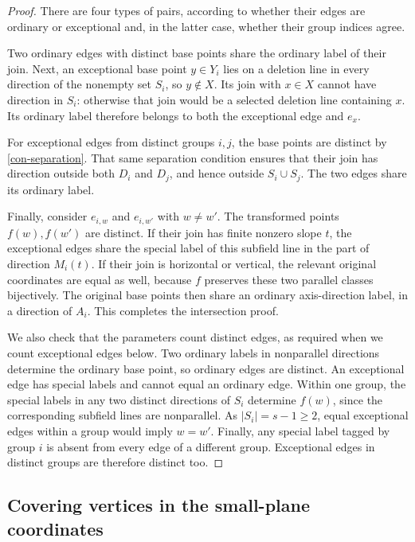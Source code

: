 \begin{proof}
There are four types of pairs, according to whether their edges are
ordinary or exceptional and, in the latter case, whether their group
indices agree.

Two ordinary edges with distinct base points share the ordinary
label of their join.  Next, an exceptional base point \(y\in Y_i\)
lies on a deletion line in every direction of the nonempty set
\(S_i\), so \(y\notin X\).  Its join with \(x\in X\) cannot
have direction in \(S_i\): otherwise that join would be a selected
deletion line containing \(x\).  Its ordinary label therefore
belongs to both the exceptional edge and \(e_x\).

For exceptional edges from distinct groups \(i,j\), the base
points are distinct by \eqref{con-separation}.  That same separation
condition ensures that their join has direction outside both
\(D_i\) and \(D_j\), and hence outside \(S_i\cup S_j\).
The two edges share its ordinary label.

Finally, consider \(e_{i,w}\) and \(e_{i,w'}\) with \(w\ne w'\).
The transformed points \(f(w),f(w')\) are distinct.  If their
join has finite nonzero slope \(t\), the exceptional edges share
the special label of this subfield line in the part of direction
\(M_i(t)\).  If their join is horizontal or vertical, the relevant
original coordinates are equal as well, because \(f\) preserves
these two parallel classes bijectively.  The original base points
then share an ordinary axis-direction label, in a direction of
\(A_i\).  This completes the intersection proof.

We also check that the parameters count distinct edges, as required
when we count exceptional edges below.  Two ordinary labels in
nonparallel directions determine the ordinary base point, so ordinary
edges are distinct.
An exceptional edge has special labels and cannot equal an ordinary
edge.  Within one group, the special labels in any two distinct
directions of \(S_i\) determine \(f(w)\), since the corresponding
subfield lines are nonparallel.  As \(|S_i|=s-1\ge2\), equal
exceptional edges within a group would imply \(w=w'\).  Finally,
any special label tagged by group \(i\) is absent from every edge
of a different group.  Exceptional edges in distinct groups are
therefore distinct too.
\end{proof}

\subsection{Covering vertices in the small-plane coordinates}

